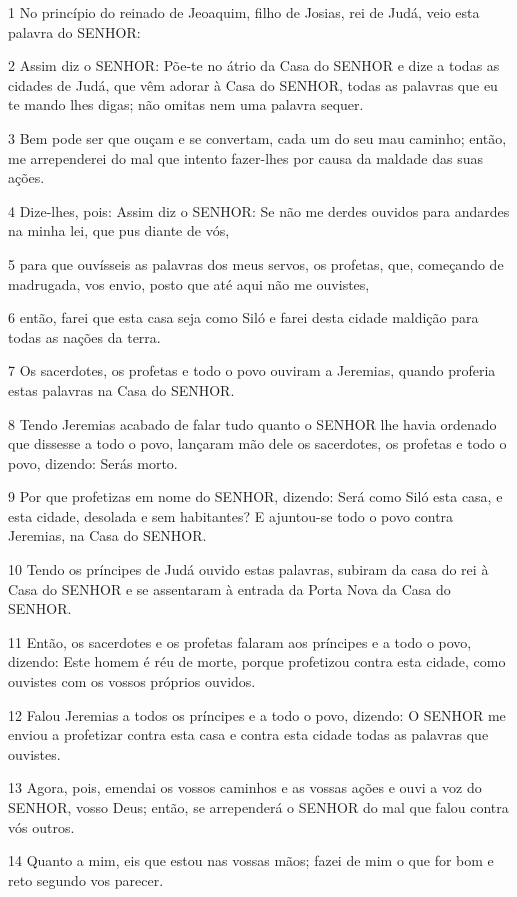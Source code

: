 \par 1 No princípio do reinado de Jeoaquim, filho de Josias, rei de Judá, veio esta palavra do SENHOR:
\par 2 Assim diz o SENHOR: Põe-te no átrio da Casa do SENHOR e dize a todas as cidades de Judá, que vêm adorar à Casa do SENHOR, todas as palavras que eu te mando lhes digas; não omitas nem uma palavra sequer.
\par 3 Bem pode ser que ouçam e se convertam, cada um do seu mau caminho; então, me arrependerei do mal que intento fazer-lhes por causa da maldade das suas ações.
\par 4 Dize-lhes, pois: Assim diz o SENHOR: Se não me derdes ouvidos para andardes na minha lei, que pus diante de vós,
\par 5 para que ouvísseis as palavras dos meus servos, os profetas, que, começando de madrugada, vos envio, posto que até aqui não me ouvistes,
\par 6 então, farei que esta casa seja como Siló e farei desta cidade maldição para todas as nações da terra.
\par 7 Os sacerdotes, os profetas e todo o povo ouviram a Jeremias, quando proferia estas palavras na Casa do SENHOR.
\par 8 Tendo Jeremias acabado de falar tudo quanto o SENHOR lhe havia ordenado que dissesse a todo o povo, lançaram mão dele os sacerdotes, os profetas e todo o povo, dizendo: Serás morto.
\par 9 Por que profetizas em nome do SENHOR, dizendo: Será como Siló esta casa, e esta cidade, desolada e sem habitantes? E ajuntou-se todo o povo contra Jeremias, na Casa do SENHOR.
\par 10 Tendo os príncipes de Judá ouvido estas palavras, subiram da casa do rei à Casa do SENHOR e se assentaram à entrada da Porta Nova da Casa do SENHOR.
\par 11 Então, os sacerdotes e os profetas falaram aos príncipes e a todo o povo, dizendo: Este homem é réu de morte, porque profetizou contra esta cidade, como ouvistes com os vossos próprios ouvidos.
\par 12 Falou Jeremias a todos os príncipes e a todo o povo, dizendo: O SENHOR me enviou a profetizar contra esta casa e contra esta cidade todas as palavras que ouvistes.
\par 13 Agora, pois, emendai os vossos caminhos e as vossas ações e ouvi a voz do SENHOR, vosso Deus; então, se arrependerá o SENHOR do mal que falou contra vós outros.
\par 14 Quanto a mim, eis que estou nas vossas mãos; fazei de mim o que for bom e reto segundo vos parecer.
